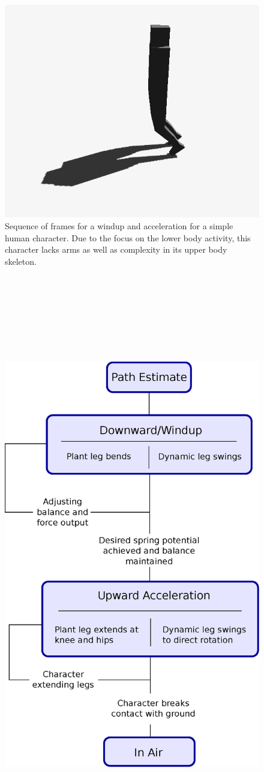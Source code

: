 \documentclass[landscape,26pt]{sciposter}
\begin{document}
\begin{minipage}[t]{17in}
\begin{figure}
            \includegraphics[width=0.2\columnwidth]{jump_sequence/jump8Cropped.png}
			\caption{Sequence of frames for a windup and acceleration for a simple human character.  Due to the focus on the lower body activity, this character lacks arms as well as complexity in its upper body skeleton.}
		\end{figure}

        \begin{figure}
            \centering
            \includegraphics[height=10in]{system_diag.eps}

\end{figure}
\end{minipage}
\end{document}
